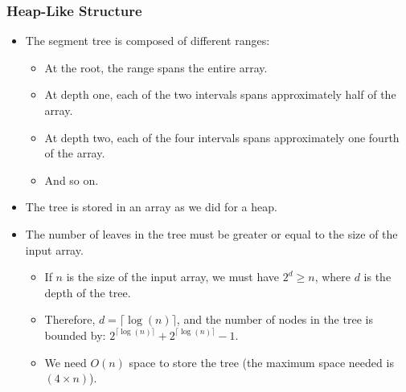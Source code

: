 \documentclass{beamer}
\begin{document}
\begin{frame}%
\frametitle{Heap-Like Structure}

\footnotesize

\begin{itemize}

\item The segment tree is composed of different ranges:
\begin{itemize}
\footnotesize
\item<1-> At the root, the range spans the entire array.

\item<2-> At depth one, each of the two intervals spans approximately half of the array.

\item<3-> At depth two, each of the four intervals spans approximately one fourth of the array.

\item<3-> And so on.

\end{itemize}


\item<4-> The tree is stored in an array as we did for a heap.


\item<5-> The number of leaves in the tree must be greater or equal to the size of the input array.
\begin{itemize}
\footnotesize
\item<6-> If $n$ is the size of the input array, we must have $2^d \ge n$, where $d$ is the depth of the tree.
\vspace{0.1cm}
\item<7-> Therefore, $d = \lceil \log(n) \rceil$, and the number of nodes in the tree is bounded by: $2^{\lceil \log(n) \rceil} + 2^{\lceil \log(n) \rceil} - 1$.
\vspace{0.1cm}
\item<8-> We need $O(n)$ space to store the tree (the maximum space needed is $(4\times n)$).

\end{itemize}

\end{itemize}

\end{frame}
\end{document}
